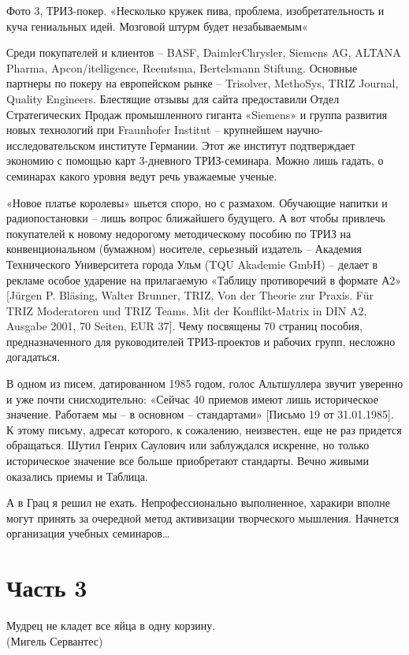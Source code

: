 \documentclass[11pt,a4paper]{article}
\begin{document}
Фото 3, ТРИЗ-покер. «Несколько кружек пива, проблема, изобретательность и куча
гениальных идей. Мозговой штурм будет незабываемым«

Среди покупателей и клиентов -- BASF, DaimlerChrysler, Siemens AG, ALTANA
Pharma, Apcon/itelligence, Reemtsma, Bertelsmann Stiftung. Основные партнеры
по покеру на европейском рынке -- Trisolver, MethoSys, TRIZ Journal, Quality
Engineers. Блестящие отзывы для сайта предоставили Отдел Стратегических Продаж
промышленного гиганта «Siemens» и группа развития новых технологий при
Fraunhofer Institut -- крупнейшем научно-исследовательском институте
Германии. Этот же институт подтверждает экономию с помощью карт 3-дневного
ТРИЗ-семинара. Можно лишь гадать, о семинарах какого уровня ведут речь
уважаемые ученые.

«Новое платье королевы» шьется споро, но с размахом. Обучающие напитки и
радиопостановки -- лишь вопрос ближайшего будущего. А вот чтобы привлечь
покупателей к новому недорогому методическому пособию по ТРИЗ на
конвенциональном (бумажном) носителе, серьезный издатель -- Академия
Технического Университета города Ульм (TQU Akademie GmbH) -- делает в рекламе
особое ударение на прилагаемую «Таблицу противоречий в формате А2» [Jürgen
  P. Bläsing, Walter Brunner, TRIZ, Von der Theorie zur Praxis. Für TRIZ
  Moderatoren und TRIZ Teams. Mit der Konflikt-Matrix in DIN A2, Ausgabe 2001,
  70 Seiten, EUR 37]. Чему посвящены 70 страниц пособия, предназначенного для
руководителей ТРИЗ-проектов и рабочих групп, несложно догадаться.

В одном из писем, датированном 1985 годом, голос Альтшуллера звучит уверенно и
уже почти снисходительно: «Сейчас 40 приемов имеют лишь историческое
значение. Работаем мы -- в основном -- стандартами» [Письмо 19 от 31.01.1985].
К этому письму, адресат которого, к сожалению, неизвестен, еще не раз придется
обращаться. Шутил Генрих Саулович или заблуждался искренне, но только
историческое значение все больше приобретают стандарты. Вечно живыми оказались
приемы и Таблица.

А в Грац я решил не ехать. Непрофессионально выполненное, харакири вполне
могут принять за очередной метод активизации творческого мышления. Начнется
организация учебных семинаров…

\section*{Часть 3}
\begin{flushright}
  Мудрец не кладет все яйца в одну корзину.\\
  (Мигель Сервантес)
\end{flushright}
\end{document}
